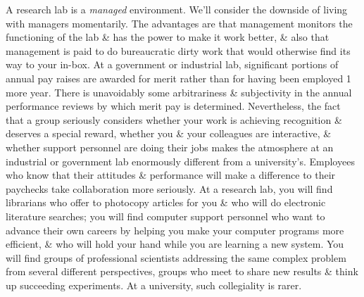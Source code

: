 \documentclass{article}
\begin{document}
\begin{enumerate}
\begin{itemize}
\begin{itemize}
			A research lab is a \textit{managed} environment. We'll consider the downside of living with managers momentarily. The advantages are that management monitors the functioning of the lab \& has the power to make it work better, \& also that management is paid to do bureaucratic dirty work that would otherwise find its way to your in-box. At a government or industrial lab, significant portions of annual pay raises are awarded for merit rather than for having been employed 1 more year. There is unavoidably some arbitrariness \& subjectivity in the annual performance reviews by which merit pay is determined. Nevertheless, the fact that a group seriously considers whether your work is achieving recognition \& deserves a special reward, whether you \& your colleagues are interactive, \& whether support personnel are doing their jobs makes the atmosphere at an industrial or government lab enormously different from a university's. Employees who know that their attitudes \& performance will make a difference to their paychecks take collaboration more seriously. At a research lab, you will find librarians who offer to photocopy articles for you \& who will do electronic literature searches; you will find computer support personnel who want to advance their own careers by helping you make your computer programs more efficient, \& who will hold your hand while you are learning a new system. You will find groups of professional scientists addressing the same complex problem from several different perspectives, groups who meet to share new results \& think up succeeding experiments. At a university, such collegiality is rarer.
			

\end{itemize}
\end{itemize}
\end{enumerate}
\end{document}
